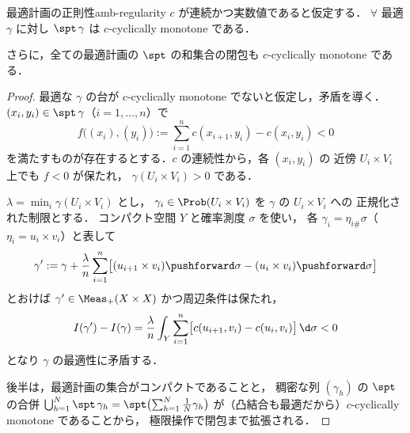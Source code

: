 \begin{theorem}{最適計画の正則性}{amb-regularity}
  $c$ が連続かつ実数値であると仮定する．
  $\forall$ 最適 $\gamma$ に対し $\spt\,\gamma$ は $c$-cyclically monotone である．

  さらに，全ての最適計画の $\spt$ の和集合の閉包も $c$-cyclically monotone である．
\end{theorem}

\begin{proof}
  最適な $\gamma$ の台が $c$-cyclically monotone でないと仮定し，矛盾を導く．
  $(x_i, y_i) \in \spt\,\gamma$（$i = 1, \ldots, n$）で
  \[
    f\bigl((x_i), (y_i)\bigr) := \sum_{i=1}^n c(x_{i+1}, y_i) - c(x_i, y_i) < 0
  \]
  を満たすものが存在するとする．$c$ の連続性から，各 $(x_i, y_i)$ の
  近傍 $U_i \times V_i$ 上でも $f < 0$ が保たれ，
  $\gamma(U_i \times V_i) > 0$ である．

  $\lambda = \min_i \gamma(U_i \times V_i)$ とし，
  $\gamma_i \in \Prob(U_i \times V_i)$ を $\gamma$ の $U_i \times V_i$ への
  正規化された制限とする．
  コンパクト空間 $Y$ と確率測度 $\sigma$ を使い，
  各 $\gamma_i = \eta_{i\#}\sigma$（$\eta_i = u_i \times v_i$）と表して
  \[
    \gamma' := \gamma + \frac{\lambda}{n} \sum_{i=1}^n
    \bigl[(u_{i+1} \times v_i)\pushforward \sigma - (u_i \times v_i)\pushforward \sigma\bigr]
  \]
  とおけば $\gamma' \in \Meas_+(X \times X)$ かつ周辺条件は保たれ，
  \[
    I(\gamma') - I(\gamma) = \frac{\lambda}{n}
    \int_Y \sum_{i=1}^n \bigl[c(u_{i+1}, v_i) - c(u_i, v_i)\bigr]\,\d\sigma < 0
  \]
  となり $\gamma$ の最適性に矛盾する．

  後半は，最適計画の集合がコンパクトであることと，
  稠密な列 $(\gamma_h)$ の $\spt$ の合併
  $\bigcup_{h=1}^N \spt\,\gamma_h = \spt\bigl(\sum_{h=1}^N \frac{1}{N}\gamma_h\bigr)$
  が（凸結合も最適だから）$c$-cyclically monotone であることから，
  極限操作で閉包まで拡張される．
\end{proof}
